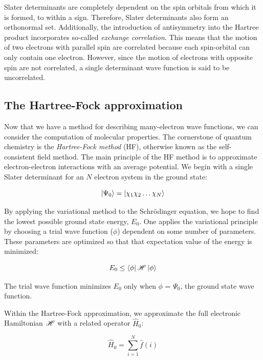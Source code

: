 Slater determinants are completely dependent on the spin orbitals from which it
is formed, to within a sign. Therefore, Slater determinants also form an
orthonormal set. Additionally, the introduction of antisymmetry into the Hartree
product incorporates so-called \emph{exchange correlation}. This means that the
motion of two electrons with parallel spin are correlated because each
spin-orbital can only contain one electron. However, since the motion of
electrons with opposite spin are not correlated, a single determinant wave
function is said to be uncorrelated.

\subsection{The Hartree-Fock approximation}

Now that we have a method for describing many-electron wave functions, we can
consider the computation of molecular properties. The cornerstone of quantum
chemistry is the \emph{Hartree-Fock method} (HF), otherwise known as the
self-consistent field method. The main principle of the HF method is to
approximate electron-electron interactions with an average potential. We begin
with a single Slater determinant for an $N$ electron system in the ground
state:

\begin{equation}
\ket{\Psi_0} = \ket{\chi_1\chi_2\dots\chi_N}
\end{equation}

\noindent By applying the variational method to the Schr{\"o}dinger equation,
we hope to find the lowest possible ground state energy, $E_0$. One applies the
variational principle by choosing a trial wave function ($\phi$) dependent on
some number of parameters. These parameters are optimized so that that
expectation value of the energy is minimized:

\begin{equation}
  E_0 \leq \bra{\phi}\mathscr{H}\ket{\phi}
\end{equation}

\noindent The trial wave function minimizes $E_0$ only when $\phi$ = $\Psi_0$,
the ground state wave function.

Within the Hartree-Fock approximation, we approximate the full electronic
Hamiltonian $\mathscr{H}$ with a related operator $\hat{H}_0$:

\begin{equation}
\hat{H}_0 = \sum_{i=1}^N \hat{f}(i)
\end{equation}

